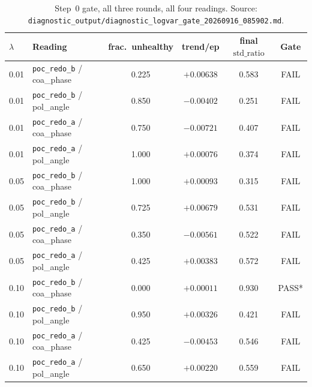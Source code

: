 \begin{table}[tbp]
    \centering
    \caption{Step~0 gate, all three rounds, all four readings. Source: \texttt{diagnostic\_output/diagnostic\_logvar\_gate\_20260916\_085902.md}.}
    \label{tab:phicpsi:redo:gate}
    \small
    \begin{tabular}{@{}llcccc@{}}
        \toprule
        $\lambda$ & Reading & frac.\ unhealthy & trend/ep & final $\text{std\_ratio}$ & Gate \\
        \midrule
        0.01 & \texttt{poc\_redo\_b} / coa\_phase & 0.225 & $+0.00638$ & 0.583 & FAIL \\
        0.01 & \texttt{poc\_redo\_b} / pol\_angle & 0.850 & $-0.00402$ & 0.251 & FAIL \\
        0.01 & \texttt{poc\_redo\_a} / coa\_phase & 0.750 & $-0.00721$ & 0.407 & FAIL \\
        0.01 & \texttt{poc\_redo\_a} / pol\_angle & 1.000 & $+0.00076$ & 0.374 & FAIL \\
        0.05 & \texttt{poc\_redo\_b} / coa\_phase & 1.000 & $+0.00093$ & 0.315 & FAIL \\
        0.05 & \texttt{poc\_redo\_b} / pol\_angle & 0.725 & $+0.00679$ & 0.531 & FAIL \\
        0.05 & \texttt{poc\_redo\_a} / coa\_phase & 0.350 & $-0.00561$ & 0.522 & FAIL \\
        0.05 & \texttt{poc\_redo\_a} / pol\_angle & 0.425 & $+0.00383$ & 0.572 & FAIL \\
        0.10 & \texttt{poc\_redo\_b} / coa\_phase & 0.000 & $+0.00011$ & 0.930 & PASS* \\
        0.10 & \texttt{poc\_redo\_b} / pol\_angle & 0.950 & $+0.00326$ & 0.421 & FAIL \\
        0.10 & \texttt{poc\_redo\_a} / coa\_phase & 0.425 & $-0.00453$ & 0.546 & FAIL \\
        0.10 & \texttt{poc\_redo\_a} / pol\_angle & 0.650 & $+0.00220$ & 0.559 & FAIL \\
        \bottomrule
    \end{tabular}
\end{table}


